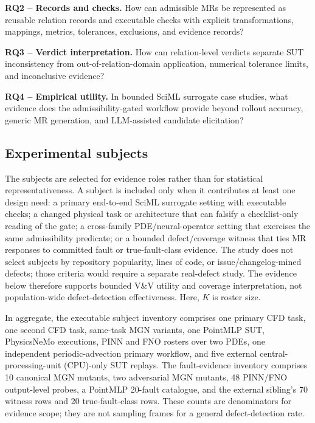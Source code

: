 \documentclass[preprint,12pt,authoryear]{elsarticle}
\begin{document}
\textbf{RQ2 -- Records and checks.} How can admissible MRs be represented as reusable relation records and executable checks with explicit transformations, mappings, metrics, tolerances, exclusions, and evidence records?

\textbf{RQ3 -- Verdict interpretation.} How can relation-level verdicts separate SUT inconsistency from out-of-relation-domain application, numerical tolerance limits, and inconclusive evidence?

\textbf{RQ4 -- Empirical utility.} In bounded SciML surrogate case studies, what evidence does the admissibility-gated workflow provide beyond rollout accuracy, generic MR generation, and LLM-assisted candidate elicitation?

\subsection{Experimental subjects}
\label{subsec:suts}

The subjects are selected for evidence roles rather than for statistical representativeness. A subject is included only when it contributes at least one design need: a primary end-to-end SciML surrogate setting with executable checks; a changed physical task or architecture that can falsify a checklist-only reading of the gate; a cross-family PDE/neural-operator setting that exercises the same admissibility predicate; or a bounded defect/coverage witness that ties MR responses to committed fault or true-fault-class evidence. The study does not select subjects by repository popularity, lines of code, or issue/changelog-mined defects; those criteria would require a separate real-defect study. The evidence below therefore supports bounded V\&V utility and coverage interpretation, not population-wide defect-detection effectiveness. Here, \(K\) is roster size.

In aggregate, the executable subject inventory comprises one primary CFD task, one second CFD task, same-task MGN variants, one PointMLP SUT, PhysicsNeMo executions, PINN and FNO rosters over two PDEs, one independent periodic-advection primary workflow, and five external central-processing-unit (CPU)-only SUT replays. The fault-evidence inventory comprises 10 canonical MGN mutants, two adversarial MGN mutants, 48 PINN/FNO output-level probes, a PointMLP 20-fault catalogue, and the external sibling's 70 witness rows and 20 true-fault-class rows. These counts are denominators for evidence scope; they are not sampling frames for a general defect-detection rate.
\end{document}
